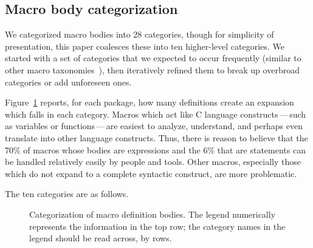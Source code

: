 \documentclass[10pt]{article}
\newcommand{\captionsmall}[1]{\caption[]{\small #1}}
\begin{document}
\subsection{Macro body categorization}

We categorized macro bodies into 28 categories, though for simplicity of
presentation, this paper coalesces these into ten higher-level categories.
We started with a set of categories that we expected to occur frequently
(similar to other macro
taxonomies~\cite{Stroustrup-DesignEvolution,Carroll95}), then iteratively
refined them to break up overbroad categories or add unforeseen ones.

Figure~\ref{fig:categorization} reports, for each package, how many
definitions create an expansion which falls in each category.  Macros which
act like C language constructs\,---\,such as variables or
functions\,---\,are easiest to analyze, understand, and perhaps even
translate into other language constructs.  Thus, there is reason to believe
that the 70\% of macros whose bodies are expressions and the 6\% that are
statements can be handled relatively easily by people and tools.  Other
macros, especially those which do not expand to a complete syntactic
construct, are more problematic.


The ten categories are as follows.  



\begin{figure}
\centerline{}
\captionsmall{Categorization of macro definition bodies.  The legend numerically
  represents the information in the top row; the category names in the
  legend should be read across, by rows.}
\label{fig:categorization}
\end{figure}



\label{sec:categorization-details}
\end{document}
